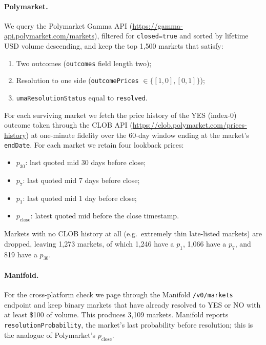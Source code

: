 \documentclass{article}
\begin{document}
\paragraph{Polymarket.} We query the Polymarket Gamma API
(\url{https://gamma-api.polymarket.com/markets}), filtered for
\texttt{closed=true} and sorted by lifetime USD volume descending, and
keep the top 1{,}500 markets that satisfy:

\begin{enumerate}
\item Two outcomes (\texttt{outcomes} field length two);
\item Resolution to one side
      (\texttt{outcomePrices} $\in \{[1,0],[0,1]\}$);
\item \texttt{umaResolutionStatus} equal to \texttt{resolved}.
\end{enumerate}

For each surviving market we fetch the price history of the YES
(index-0) outcome token through the CLOB API
(\url{https://clob.polymarket.com/prices-history}) at one-minute
fidelity over the 60-day window ending at the market's
\texttt{endDate}. For each market we retain four lookback prices:

\begin{itemize}
\item $p_{30}$: last quoted mid 30 days before close;
\item $p_{7}$: last quoted mid 7 days before close;
\item $p_{1}$: last quoted mid 1 day before close;
\item $p_{\mathrm{close}}$: latest quoted mid before the close
      timestamp.
\end{itemize}

Markets with no CLOB history at all (e.g.\ extremely thin late-listed
markets) are dropped, leaving 1{,}273 markets, of which 1{,}246 have
a $p_{1}$, 1{,}066 have a $p_{7}$, and 819 have a $p_{30}$.

\paragraph{Manifold.} For the cross-platform check we page through the
Manifold \texttt{/v0/markets} endpoint and keep binary markets that
have already resolved to YES or NO with at least \$100 of volume.
This produces 3{,}109 markets. Manifold reports
\texttt{resolutionProbability}, the market's last probability before
resolution; this is the analogue of Polymarket's $p_{\mathrm{close}}$.
\end{document}
